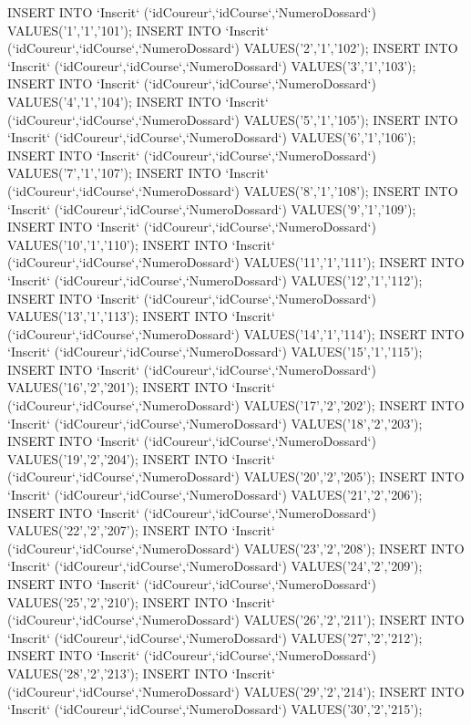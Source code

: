 \begin{DoxyCode}
INSERT INTO `Inscrit` (`idCoureur`,`idCourse`,`NumeroDossard`) VALUES('1','1','101');
INSERT INTO `Inscrit` (`idCoureur`,`idCourse`,`NumeroDossard`) VALUES('2','1','102');
INSERT INTO `Inscrit` (`idCoureur`,`idCourse`,`NumeroDossard`) VALUES('3','1','103');
INSERT INTO `Inscrit` (`idCoureur`,`idCourse`,`NumeroDossard`) VALUES('4','1','104');
INSERT INTO `Inscrit` (`idCoureur`,`idCourse`,`NumeroDossard`) VALUES('5','1','105');
INSERT INTO `Inscrit` (`idCoureur`,`idCourse`,`NumeroDossard`) VALUES('6','1','106');
INSERT INTO `Inscrit` (`idCoureur`,`idCourse`,`NumeroDossard`) VALUES('7','1','107');
INSERT INTO `Inscrit` (`idCoureur`,`idCourse`,`NumeroDossard`) VALUES('8','1','108');
INSERT INTO `Inscrit` (`idCoureur`,`idCourse`,`NumeroDossard`) VALUES('9','1','109');
INSERT INTO `Inscrit` (`idCoureur`,`idCourse`,`NumeroDossard`) VALUES('10','1','110');
INSERT INTO `Inscrit` (`idCoureur`,`idCourse`,`NumeroDossard`) VALUES('11','1','111');
INSERT INTO `Inscrit` (`idCoureur`,`idCourse`,`NumeroDossard`) VALUES('12','1','112');
INSERT INTO `Inscrit` (`idCoureur`,`idCourse`,`NumeroDossard`) VALUES('13','1','113');
INSERT INTO `Inscrit` (`idCoureur`,`idCourse`,`NumeroDossard`) VALUES('14','1','114');
INSERT INTO `Inscrit` (`idCoureur`,`idCourse`,`NumeroDossard`) VALUES('15','1','115');
INSERT INTO `Inscrit` (`idCoureur`,`idCourse`,`NumeroDossard`) VALUES('16','2','201');
INSERT INTO `Inscrit` (`idCoureur`,`idCourse`,`NumeroDossard`) VALUES('17','2','202');
INSERT INTO `Inscrit` (`idCoureur`,`idCourse`,`NumeroDossard`) VALUES('18','2','203');
INSERT INTO `Inscrit` (`idCoureur`,`idCourse`,`NumeroDossard`) VALUES('19','2','204');
INSERT INTO `Inscrit` (`idCoureur`,`idCourse`,`NumeroDossard`) VALUES('20','2','205');
INSERT INTO `Inscrit` (`idCoureur`,`idCourse`,`NumeroDossard`) VALUES('21','2','206');
INSERT INTO `Inscrit` (`idCoureur`,`idCourse`,`NumeroDossard`) VALUES('22','2','207');
INSERT INTO `Inscrit` (`idCoureur`,`idCourse`,`NumeroDossard`) VALUES('23','2','208');
INSERT INTO `Inscrit` (`idCoureur`,`idCourse`,`NumeroDossard`) VALUES('24','2','209');
INSERT INTO `Inscrit` (`idCoureur`,`idCourse`,`NumeroDossard`) VALUES('25','2','210');
INSERT INTO `Inscrit` (`idCoureur`,`idCourse`,`NumeroDossard`) VALUES('26','2','211');
INSERT INTO `Inscrit` (`idCoureur`,`idCourse`,`NumeroDossard`) VALUES('27','2','212');
INSERT INTO `Inscrit` (`idCoureur`,`idCourse`,`NumeroDossard`) VALUES('28','2','213');
INSERT INTO `Inscrit` (`idCoureur`,`idCourse`,`NumeroDossard`) VALUES('29','2','214');
INSERT INTO `Inscrit` (`idCoureur`,`idCourse`,`NumeroDossard`) VALUES('30','2','215');


\end{DoxyCode}

